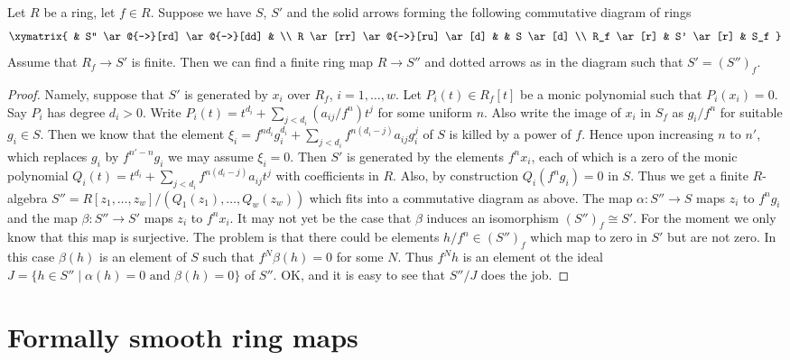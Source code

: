 \begin{lemma}
\label{lemma-finite-after-localization}
Let $R$ be a ring, let $f \in R$.
Suppose we have $S$, $S'$ and the solid arrows
forming the following commutative diagram of rings
$$
\xymatrix{
& S'' \ar@{-->}[rd] \ar@{-->}[dd] &
\\
R \ar[rr] \ar@{-->}[ru] \ar[d] &  & S \ar[d]
\\
R_f \ar[r] & S' \ar[r] & S_f
}
$$
Assume that $R_f \to S'$ is finite. Then we can find
a finite ring map $R \to S''$ and dotted arrows as
in the diagram such that $S' = (S'')_f$.
\end{lemma}

\begin{proof}
Namely, suppose that $S'$ is generated by
$x_i$ over $R_f$, $i = 1, \ldots, w$. Let $P_i(t) \in R_f[t]$
be a monic polynomial such that $P_i(x_i) = 0$.
Say $P_i$ has degree $d_i > 0$. Write
$P_i(t) = t^{d_i} + \sum_{j < d_i} (a_{ij}/f^n) t^j$
for some uniform $n$. Also write
the image of $x_i$ in $S_f$ as $g_i / f^n$
for suitable $g_i \in S$. Then we know
that the element
$\xi_i = f^{nd_i} g_i^{d_i} + \sum_{j < d_i} f^{n(d_i - j)} a_{ij} g_i^j$
of $S$ is killed by a power of $f$.
Hence upon increasing $n$ to $n'$, which replaces
$g_i$ by $f^{n' - n}g_i$ we may assume $\xi_i = 0$.
Then $S'$ is generated by the elements
$f^n x_i$, each of which is a zero of the
monic polynomial $Q_i(t) = t^{d_i} +
\sum_{j < d_i} f^{n(d_i - j)} a_{ij} t^j$
with coefficients in $R$. Also, by construction
$Q_i(f^ng_i) = 0$ in $S$. Thus we get a finite $R$-algebra
$S'' = R[z_1, \ldots, z_w]/(Q_1(z_1), \ldots, Q_w(z_w))$
which fits into a commutative diagram as above.
The map $\alpha : S'' \to S$ maps $z_i$ to $f^ng_i$ and
the map $\beta : S'' \to S'$ maps $z_i$ to $f^nx_i$.
It may not yet be the case that $\beta$ induces an
isomorphism $(S'')_f \cong S'$.
For the moment we only know that this map
is surjective. The problem is that there could be
elements $h/f^n \in (S'')_f$ which map to zero
in $S'$ but are not zero. In this case $\beta(h)$
is an element of $S$ such that $f^N \beta(h) = 0$
for some $N$. Thus $f^N h$ is an element ot the ideal
$J = \{h \in S'' \mid \alpha(h) = 0 \text{ and }
\beta(h) = 0\}$ of $S''$. OK, and it is easy to see that
$S''/J$ does the job.
\end{proof}




\section{Formally smooth ring maps}
\label{section-formally-smooth}

